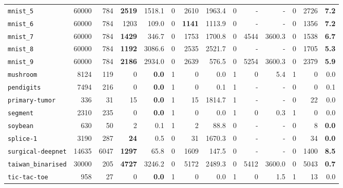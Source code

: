 \begin{tabular}{lccrrrrrrrrrrr}
\texttt{mnist\_5} & \multicolumn{1}{r}{60000} & \multicolumn{1}{r}{784}  & \textbf{2519} & 1518.1 & 0 & 2610 & 1963.4 & 0 & - & - & 0 & 2726 & \textbf{7.2}\\
\texttt{mnist\_6} & \multicolumn{1}{r}{60000} & \multicolumn{1}{r}{784}  & 1203 & 109.0 & 0 & \textbf{1141} & 1113.9 & 0 & - & - & 0 & 1356 & \textbf{7.2}\\
\texttt{mnist\_7} & \multicolumn{1}{r}{60000} & \multicolumn{1}{r}{784}  & \textbf{1429} & 346.7 & 0 & 1753 & 1700.8 & 0 & 4544 & 3600.3 & 0 & 1538 & \textbf{6.7}\\
\texttt{mnist\_8} & \multicolumn{1}{r}{60000} & \multicolumn{1}{r}{784}  & \textbf{1192} & 3086.6 & 0 & 2535 & 2521.7 & 0 & - & - & 0 & 1705 & \textbf{5.3}\\
\texttt{mnist\_9} & \multicolumn{1}{r}{60000} & \multicolumn{1}{r}{784}  & \textbf{2186} & 2934.0 & 0 & 2639 & 576.5 & 0 & 5254 & 3600.3 & 0 & 2379 & \textbf{5.9}\\
\texttt{mushroom} & \multicolumn{1}{r}{8124} & \multicolumn{1}{r}{119}  & 0 & \textbf{0.0} & 1 & 0 & 0.0 & 1 & 0 & 5.4 & 1 & 0 & 0.0\\
\texttt{pendigits} & \multicolumn{1}{r}{7494} & \multicolumn{1}{r}{216}  & 0 & \textbf{0.0} & 1 & 0 & 0.1 & 1 & - & - & 0 & 0 & 0.1\\
\texttt{primary-tumor} & \multicolumn{1}{r}{336} & \multicolumn{1}{r}{31}  & 15 & \textbf{0.0} & 1 & 15 & 1814.7 & 1 & - & - & 0 & 22 & 0.0\\
\texttt{segment} & \multicolumn{1}{r}{2310} & \multicolumn{1}{r}{235}  & 0 & \textbf{0.0} & 1 & 0 & 0.0 & 1 & 0 & 0.3 & 1 & 0 & 0.0\\
\texttt{soybean} & \multicolumn{1}{r}{630} & \multicolumn{1}{r}{50}  & 2 & 0.1 & 1 & 2 & 88.8 & 0 & - & - & 0 & 8 & \textbf{0.0}\\
\texttt{splice-1} & \multicolumn{1}{r}{3190} & \multicolumn{1}{r}{287}  & \textbf{24} & 0.5 & 0 & 31 & 1670.3 & 0 & - & - & 0 & 34 & \textbf{0.0}\\
\texttt{surgical-deepnet} & \multicolumn{1}{r}{14635} & \multicolumn{1}{r}{6047}  & \textbf{1297} & 65.8 & 0 & 1609 & 147.5 & 0 & - & - & 0 & 1400 & \textbf{8.5}\\
\texttt{taiwan\_binarised} & \multicolumn{1}{r}{30000} & \multicolumn{1}{r}{205}  & \textbf{4727} & 3246.2 & 0 & 5172 & 2489.3 & 0 & 5412 & 3600.0 & 0 & 5043 & \textbf{0.7}\\
\texttt{tic-tac-toe} & \multicolumn{1}{r}{958} & \multicolumn{1}{r}{27}  & 0 & \textbf{0.0} & 1 & 0 & 0.0 & 1 & 0 & 1.5 & 1 & 13 & 0.0\\

\end{tabular}
